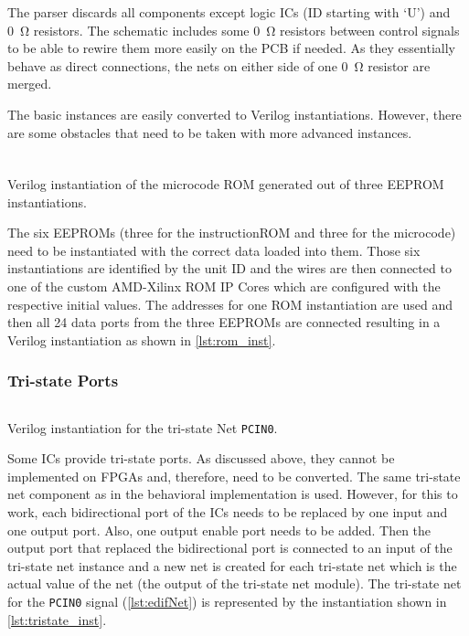 The parser discards all components except logic \glspl{IC} (ID starting with `U') and \qty{0}{\ohm} resistors.
The schematic includes some \qty{0}{\ohm} resistors between control signals to be able to rewire them more easily on the \gls{PCB} if needed.
As they essentially behave as direct connections, the nets on either side of one \qty{0}{\ohm} resistor are merged.

The basic instances are easily converted to Verilog instantiations.
However, there are some obstacles that need to be taken with more advanced instances.
\subsubsection{}
\begin{listing}[t]
  \inputminted[linenos,
    breaklines,
    firstline=1364,
    lastline=1368,
    frame=leftline,
    xleftmargin=20pt,
  ]{Verilog}{src/generated.v}
  \caption{Verilog instantiation of the microcode ROM generated out of three \gls{EEPROM} instantiations.}
  \label{lst:rom_inst}
\end{listing}
The six \glspl{EEPROM} (three for the instructionROM and three for the microcode) need to be instantiated with the correct data loaded into them.
Those six instantiations are identified by the unit ID and the wires are then connected to one of the custom AMD-Xilinx ROM IP Cores which are configured with the respective initial values.
The addresses for one ROM instantiation are used and then all 24 data ports from the three \glspl{EEPROM} are connected resulting in a Verilog instantiation as shown in \cref{lst:rom_inst}.
\subsubsection{Tri-state Ports}
\begin{listing}[t]
  \inputminted[linenos,
    breaklines,
    firstline=1794,
    lastline=1801,
    frame=leftline,
    xleftmargin=20pt,
  ]{Verilog}{src/generated.v}
\caption{Verilog instantiation for the tri-state Net \texttt{PCIN0}.}
  \label{lst:tristate_inst}
\end{listing}
Some \glspl{IC} provide tri-state ports.
As discussed above, they cannot be implemented on \glspl{FPGA} and, therefore, need to be converted.
The same tri-state net component as in the behavioral implementation is used.
However, for this to work, each bidirectional port of the \glspl{IC} needs to be replaced by one input and one output port.
Also, one output enable port needs to be added.
Then the output port that replaced the bidirectional port is connected to an input of the tri-state net instance and a new net is created for each tri-state net which is the actual value of the net (the output of the tri-state net module).
The tri-state net for the \texttt{PCIN0} signal (\cref{lst:edifNet}) is represented by the instantiation shown in \cref{lst:tristate_inst}.

